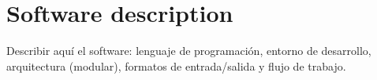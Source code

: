 \section{Software description}
\label{sec:descripcion}

Describir aquí el software: lenguaje de programación, entorno de desarrollo, arquitectura (modular), formatos de entrada/salida y flujo de trabajo.

